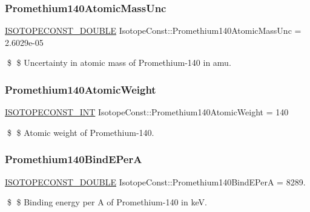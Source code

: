 \subsubsection{\texorpdfstring{Promethium140\+Atomic\+Mass\+Unc}{Promethium140AtomicMassUnc}}
{\footnotesize\ttfamily \mbox{\hyperlink{group___isotope_const-_macros_ga8f45a7272ce02c0b4c65c44636ed719a}{I\+S\+O\+T\+O\+P\+E\+C\+O\+N\+S\+T\+\_\+\+D\+O\+U\+B\+LE}} Isotope\+Const\+::\+Promethium140\+Atomic\+Mass\+Unc = 2.\+6029e-\/05}

\$ \$ Uncertainty in atomic mass of Promethium-\/140 in amu. \mbox{\label{group___isotope_const-_promethium-_pm140_ga51eb8b2609a906032800031ee971365a}} 
\subsubsection{\texorpdfstring{Promethium140\+Atomic\+Weight}{Promethium140AtomicWeight}}
{\footnotesize\ttfamily \mbox{\hyperlink{group___isotope_const-_macros_ga5f18360b3e99483a35c32d789e62621c}{I\+S\+O\+T\+O\+P\+E\+C\+O\+N\+S\+T\+\_\+\+I\+NT}} Isotope\+Const\+::\+Promethium140\+Atomic\+Weight = 140}

\$ \$ Atomic weight of Promethium-\/140. \mbox{\label{group___isotope_const-_promethium-_pm140_gad6779d0d015cef75e51f5b981cf8dbaf}} 
\subsubsection{\texorpdfstring{Promethium140\+Bind\+E\+PerA}{Promethium140BindEPerA}}
{\footnotesize\ttfamily \mbox{\hyperlink{group___isotope_const-_macros_ga8f45a7272ce02c0b4c65c44636ed719a}{I\+S\+O\+T\+O\+P\+E\+C\+O\+N\+S\+T\+\_\+\+D\+O\+U\+B\+LE}} Isotope\+Const\+::\+Promethium140\+Bind\+E\+PerA = 8289.}

\$ \$ Binding energy per A of Promethium-\/140 in keV. \mbox{\label{group___isotope_const-_promethium-_pm140_gac4269ea76ffc79db2abe8f6c90896a2b}} 
